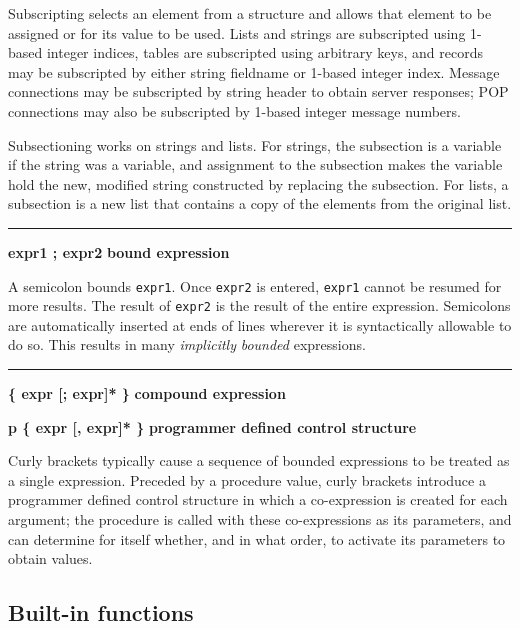 Subscripting selects an element from a structure and allows that element
to be assigned or for its value to be used. Lists and strings are
subscripted using 1-based integer indices, tables are subscripted using
arbitrary keys, and records may be subscripted by either string
fieldname or 1-based integer index. Message connections may be
subscripted by string header to obtain server responses; POP
connections may also be subscripted by 1-based integer message numbers.

Subsectioning works on strings and lists. For strings, the subsection is
a variable if the string was a variable, and
assignment to the subsection makes the
variable hold the new, modified string constructed by replacing the subsection.
For lists, a subsection is a new
list that contains a copy of the elements from the original list.

\bigskip\hrule\vspace{0.1cm}
\noindent
{\bf expr1 ; expr2 } \hfill {\bf bound expression}

\noindent
A semicolon bounds \texttt{expr1}. Once \texttt{expr2} is entered,
\texttt{expr1} cannot be resumed for more results. The result of
\texttt{expr2} is the result of the entire expression.
Semicolons are automatically
inserted at ends of lines wherever it is syntactically
allowable to do so. This results in many \textit{implicitly} 
\textit{bounded} expressions.

\bigskip\hrule\vspace{0.1cm}
\noindent
{\bf \{ expr [; expr]* \} } \hfill {\bf compound expression}

\noindent
{\bf p \{ expr [, expr]* \} } \hfill {\bf programmer defined control structure}

\noindent
Curly brackets typically cause a sequence
of bounded expressions to be treated as a single expression. Preceded
by a procedure value, curly brackets introduce a programmer defined
control structure in which a co-expression is created for each
argument; the procedure is called with these co-expressions as its
parameters, and can determine for itself whether, and in what order, to
activate its parameters to obtain values.

\subsection*{Built-in functions}

